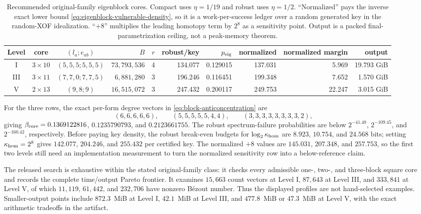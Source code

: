 \documentclass[11pt]{article}
\begin{document}
\begin{table}[H]
\centering
\caption{Recommended original-family eigenblock cores.  Compact uses
$\eta=1/19$ and robust uses $\eta=1/2$.  ``Normalized'' pays the inverse exact
lower bound \eqref{eq:eigenblock-vulnerable-density}, so it is a
work-per-success ledger over a random generated key in the random-XOF
idealization.  ``$+8$'' multiplies the leading homotopy term by $2^8$ as a
sensitivity point.  Output is a packed final-parametrization ceiling, not a
peak-memory theorem.}
\label{tab:eigenblock-core}
\scriptsize
\setlength{\tabcolsep}{3.0pt}
\begin{tabular}{@{}c c c r c r r r r r@{}}
\toprule
Level & core & $(l_a;e_{ab})$ & $B$ & $r$ & robust/key & $p_{\rm eig}$ & normalized & normalized margin & output\\
\midrule
I & $3\times10$ & $(5,5,5;5,5,5)$ & $73{,}793{,}536$ & 4 & 134.077 & 0.129015 & 137.031 & 5.969 & 19.793 GiB\\
III & $3\times11$ & $(7,7,0;7,7,5)$ & $6{,}881{,}280$ & 3 & 196.246 & 0.116451 & 199.348 & 7.652 & 1.570 GiB\\
V & $2\times13$ & $(9,8;9)$ & $16{,}515{,}072$ & 3 & 247.432 & 0.200117 & 249.753 & 22.247 & 3.015 GiB\\
\bottomrule
\end{tabular}
\end{table}

For the three rows, the exact per-form degree vectors in
\eqref{eq:block-anticoncentration} are
\[
 (6,6,6,6,6),\qquad
 (5,5,5,5,5,4,4),\qquad
 (3,3,3,3,3,3,3,3,2),
\]
giving $\beta_{\rm core}=0.1369122816$, $0.1235790793$, and
$0.2123661755$.  The robust spectrum-failure probabilities are below
$2^{-41.48}$, $2^{-109.45}$, and $2^{-160.42}$, respectively.  Before paying
key density, the robust break-even budgets for
$\log_2\kappa_{\rm hom}$ are $8.923$, $10.754$, and $24.568$ bits; setting
$\kappa_{\rm hom}=2^8$ gives $142.077$, $204.246$, and $255.432$ per
certified key.  The normalized $+8$ values are $145.031$, $207.348$, and
$257.753$, so the first two levels still need an implementation measurement to
turn the normalized sensitivity row into a below-reference claim.

The released search is exhaustive within the stated original-family class:
it checks every admissible one-, two-, and three-block square core and records
the complete time/output Pareto frontier.  It examines $15{,}663$ count
vectors at Level I, $87{,}643$ at Level III, and $333{,}841$ at Level V, of
which $11{,}119$, $61{,}442$, and $232{,}706$ have nonzero B\'ezout number.
Thus the displayed profiles are not hand-selected examples.  Smaller-output
points include $872.3$~MiB at Level I, $42.1$~MiB at Level III, and
$477.8$~MiB or $47.3$~MiB at Level V, with the exact arithmetic tradeoffs in
the artifact.
\end{document}
